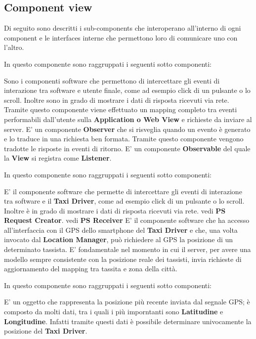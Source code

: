 \subsection{Component view}
Di seguito sono descritti i sub-components che interoperano all'interno di ogni component e le interfaces interne che permettono loro di comunicare uno con l'altro.
\begin{itemize}
	In questo componente sono raggruppati i seguenti sotto componenti:
	\begin{itemize}
		 Sono i componenti software che permettono di intercettare gli eventi di interazione tra software e utente finale, come ad esempio click di un pulsante o lo scroll. 
		Inoltre sono in grado di mostrare i dati di risposta ricevuti via rete.
		 Tramite questo componente viene effettuato un mapping completo tra eventi performabili dall'utente sulla \textbf{Application o Web View} e richieste da inviare al server. 
		E' un componente \textbf{Observer} che si risveglia quando un evento è generato e lo traduce in una richiesta ben formata. 
		 Tramite questo componente vengono tradotte le risposte in eventi di ritorno.
		E' un componente \textbf{Observable} del quale la \textbf{View} si registra come \textbf{Listener}.
	\end{itemize}
	\itemBold{Taxi Driver View}
	In questo componente sono raggruppati i seguenti sotto componenti:
	\begin{itemize}
		 E' il componente software che permette di intercettare gli eventi di interazione tra software e il \textbf{Taxi Driver}, come ad esempio click di un pulsante o lo scroll. 
		Inoltre è in grado di mostrare i dati di risposta ricevuti via rete.
		 vedi \textbf{PS Request Creator}.
		 vedi \textbf{PS Receiver}
		 E' il componente software che ha accesso all'interfaccia con il GPS dello smartphone del \textbf{Taxi Driver} e che, una volta invocato dal \textbf{Location Manager}, può richiedere al GPS la posizione di un determinato tassista. 
		E' fondamentale nel momento in cui il server, per avere una modello sempre consistente con la posizione reale dei tassisti, invia richieste di aggiornamento del mapping tra tassita e zona della città.
	\end{itemize}	
	\itemBold{Taxi Driver Model}
	In questo componente sono raggruppati i seguenti sotto componenti:
	\begin{itemize}
		 E' un oggetto che rappresenta la posizione più recente inviata dal segnale GPS; è composto da molti dati, tra i quali i più imporntanti sono \textbf{Latitudine} e \textbf{Longitudine}.
		Infatti tramite questi dati è possibile determinare univocamente la posizione del \textbf{Taxi Driver}.
	\end{itemize}
	

\end{itemize}
